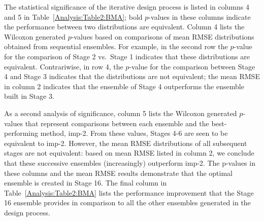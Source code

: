 \documentclass[journal=jpcbfk, manuscript=article]{achemso}
\newcommand{\+}[1]{\ensuremath{\mathbf{#1}}}
\begin{document}
The statistical significance of the iterative design process is listed in columns 4 and 5 in Table~\ref{Analysis:Table2:BMA}; bold $p$-values in these columns indicate the performance between two distributions are equivalent.
Column 4 lists the Wilcoxon generated $p$-values based on comparisons of mean RMSE distributions obtained from sequential ensembles.
For example, in the second row the $p$-value for the comparison of Stage 2 vs.~Stage 1 indicates that these distributions are equivalent.
Contrariwise, in row 4, the $p$-value for the comparison between Stage 4 and Stage 3 indicates that the distributions are not equivalent; the mean RMSE in column 2 indicates that the ensemble of Stage 4 outperforms the ensemble built in Stage 3.

As a second analysis of significance, column 5 lists the Wilcoxon generated $p$-values that represent comparisons between each ensemble and the best-performing method, imp-2.
From these values, Stages 4-6 are seen to be equivalent to imp-2.
However, the mean RMSE distributions of all subsequent stages are not equivalent: based on mean RMSE listed in column 2, we conclude that these successive ensembles (increasingly) outperform imp-2.
The p-values in these columns and the mean RMSE results demonstrate that the optimal ensemble is created in Stage 16.
The final column in Table~\ref{Analysis:Table2:BMA} lists the performance improvement that the Stage 16 ensemble provides in comparison to all the other ensembles generated in the design process.
\end{document}
